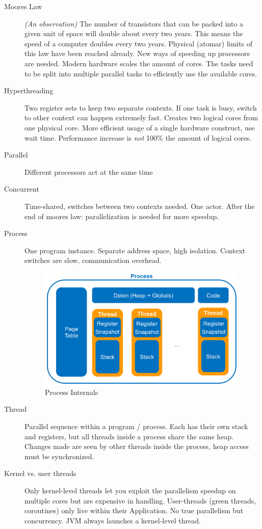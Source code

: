 \begin{description}
  \item[Moores Law] \textit{(An observation)} The number of transistors that can be packed into a given unit of space will double about every two years.  This means the speed of a computer doubles every two years.
  Physical (atomar) limits of this law have been reached already. New ways of speeding up processors are needed.
  Modern hardware scales the amount of cores. The tasks need to be split into multiple parallel tasks to efficiently use the available cores.
  \item[Hyperthreading] Two register sets to keep two separate contexts. If one task is busy, switch to other context can happen extremely fast. Creates two logical cores from one physical core. More efficient usage of a single hardware construct, use wait time. 
  Performance increase is \emph{not} 100\% the amount of logical cores.
  \item[Parallel] Different processors act at the same time
  \item[Concurrent] Time-shared, switches between two contexts needed. One actor.
  After the end of moores law: parallelization is needed for more speedup.
  \item[Process] One program instance. Separate address space, high isolation. Context switches are slow, communication overhead.
  \begin{figure}[H]
    \centering
    \includegraphics[width=10cm]{res/01-process.png}
    \caption{Process Internals}
  \end{figure}
  \item[Thread] Parallel sequence within a program / process. Each has their own stack and registers, but all threads inside a process share the same heap. Changes made are seen by other threads inside the process, heap access must be synchronized.
  \item[Kernel vs. user threads] 
  Only kernel-level threads let you exploit the parallelism speedup on multiple cores but are expensive in handling. User-threads (green threads, coroutines) only live within their Application. No true parallelism but concurrency. JVM always launches a kernel-level thread.


\end{description}
